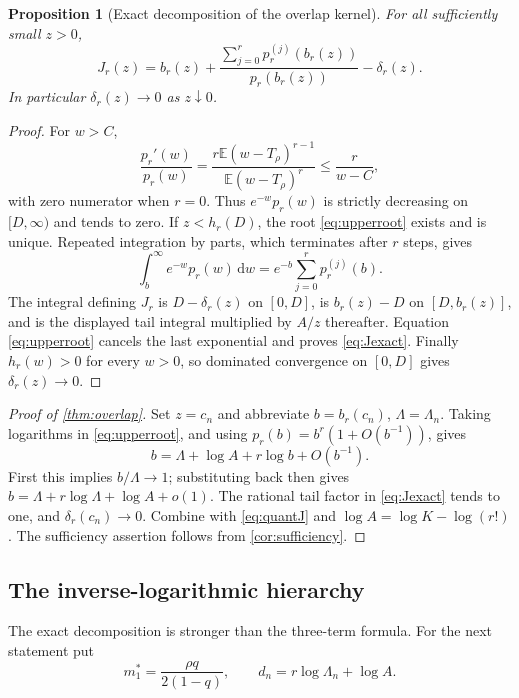 \documentclass[11pt,oneside]{article}
\numberwithin{equation}{section}
\theoremstyle{plain}
\newtheorem{proposition}[theorem]{Proposition}
\theoremstyle{definition}
\theoremstyle{remark}
\newcommand{\E}{\mathbb E}
\newcommand{\dd}{\,\mathrm d}
\begin{document}
\begin{proposition}[Exact decomposition of the overlap kernel]
\label{prop:Jexact}
For all sufficiently small $z>0$,
\begin{equation}\label{eq:Jexact}
 J_r(z)=b_r(z)+
 \frac{\displaystyle\sum_{j=0}^r p_r^{(j)}(b_r(z))}{p_r(b_r(z))}
 -\delta_r(z).
\end{equation}
In particular $\delta_r(z)\to0$ as $z\downarrow0$.
\end{proposition}
\begin{proof}
For $w>C$,
\[
 \frac{p_r'(w)}{p_r(w)}
 =\frac{r\E(w-T_\rho)^{r-1}}{\E(w-T_\rho)^r}
 \le\frac r{w-C},
\]
with zero numerator when $r=0$. Thus $e^{-w}p_r(w)$ is strictly
decreasing on $[D,\infty)$ and tends to zero. If $z<h_r(D)$,
the root \eqref{eq:upperroot} exists and is unique. Repeated integration
by parts, which terminates after $r$ steps, gives
\[
 \int_b^\infty e^{-w}p_r(w)\dd w
   =e^{-b}\sum_{j=0}^r p_r^{(j)}(b).
\]
The integral defining $J_r$ is $D-\delta_r(z)$ on $[0,D]$,
is $b_r(z)-D$ on $[D,b_r(z)]$, and is the displayed tail integral
multiplied by $A/z$ thereafter. Equation \eqref{eq:upperroot}
cancels the last exponential and proves \eqref{eq:Jexact}.
Finally $h_r(w)>0$ for every $w>0$, so dominated convergence on
$[0,D]$ gives $\delta_r(z)\to0$.
\end{proof}

\begin{proof}[Proof of \cref{thm:overlap}]
Set $z=c_n$ and abbreviate $b=b_r(c_n)$, $\Lambda=\Lambda_n$.
Taking logarithms in \eqref{eq:upperroot}, and using
$p_r(b)=b^r(1+O(b^{-1}))$, gives
\[
 b=\Lambda+\log A+r\log b+O(b^{-1}).
\]
First this implies $b/\Lambda\to1$; substituting back then gives
$b=\Lambda+r\log\Lambda+\log A+o(1)$. The rational tail factor
in \eqref{eq:Jexact} tends to one, and $\delta_r(c_n)\to0$.
Combine with \eqref{eq:quantJ} and $\log A=\log K-\log(r!)$.
The sufficiency assertion follows from \cref{cor:sufficiency}.
\end{proof}

\subsection{The inverse-logarithmic hierarchy}
The exact decomposition is stronger than the three-term formula.
For the next statement put
\[m_1^*=\frac{\rho q}{2(1-q)},\qquad d_n=r\log\Lambda_n+\log A.\]
\end{document}
